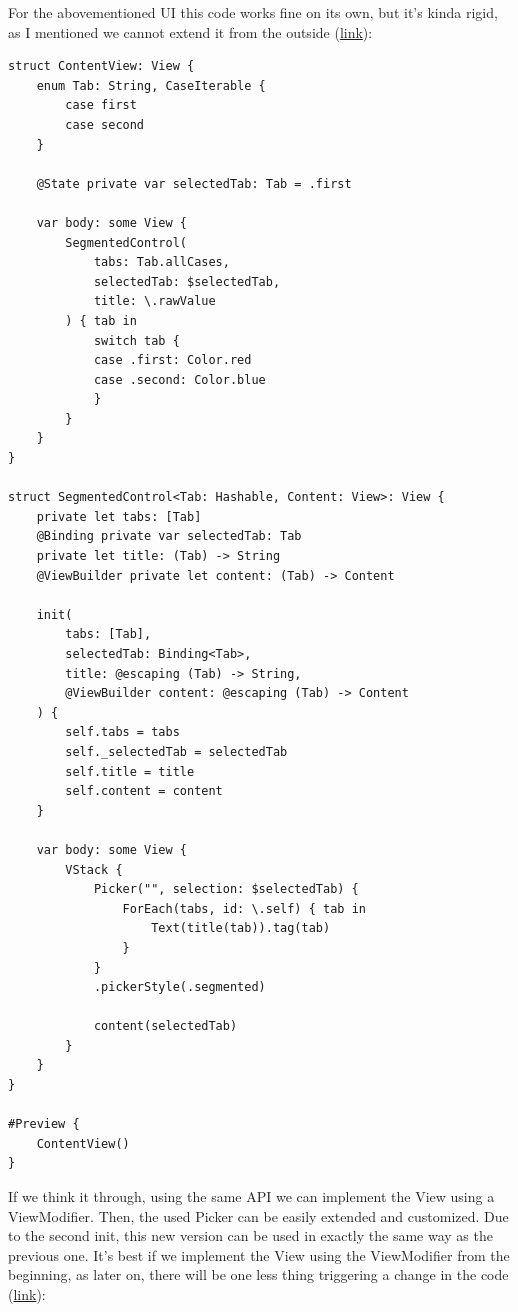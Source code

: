 \documentclass{article}
\begin{document}
For the abovementioned UI this code works fine on its own, but it’s kinda rigid, as I mentioned we cannot extend it from the outside (\href{https://github.com/stateman92/Medium-ViewModifier/commit/1daa56086a4baa98ab8bace01157e35aaf7fc7fb}{link}):

\begin{lstlisting}
struct ContentView: View {
    enum Tab: String, CaseIterable {
        case first
        case second
    }

    @State private var selectedTab: Tab = .first

    var body: some View {
        SegmentedControl(
            tabs: Tab.allCases,
            selectedTab: $selectedTab,
            title: \.rawValue
        ) { tab in
            switch tab {
            case .first: Color.red
            case .second: Color.blue
            }
        }
    }
}

struct SegmentedControl<Tab: Hashable, Content: View>: View {
    private let tabs: [Tab]
    @Binding private var selectedTab: Tab
    private let title: (Tab) -> String
    @ViewBuilder private let content: (Tab) -> Content

    init(
        tabs: [Tab],
        selectedTab: Binding<Tab>,
        title: @escaping (Tab) -> String,
        @ViewBuilder content: @escaping (Tab) -> Content
    ) {
        self.tabs = tabs
        self._selectedTab = selectedTab
        self.title = title
        self.content = content
    }

    var body: some View {
        VStack {
            Picker("", selection: $selectedTab) {
                ForEach(tabs, id: \.self) { tab in
                    Text(title(tab)).tag(tab)
                }
            }
            .pickerStyle(.segmented)

            content(selectedTab)
        }
    }
}

#Preview {
    ContentView()
}
\end{lstlisting}

If we think it through, using the same API we can implement the View using a ViewModifier. Then, the used Picker can be easily extended and customized. Due to the second init, this new version can be used in exactly the same way as the previous one. It’s best if we implement the View using the ViewModifier from the beginning, as later on, there will be one less thing triggering a change in the code (\href{https://github.com/stateman92/Medium-ViewModifier/commit/b56ce87e3479db1049aec02159c3b68e15509f42}{link}):
\end{document}
